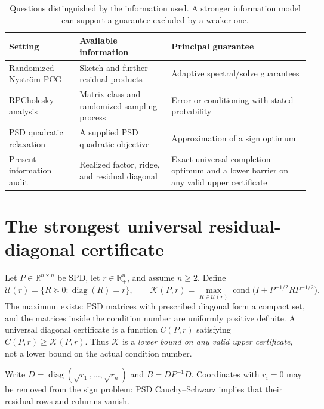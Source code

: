 \documentclass[final,leqno,letterpaper]{etna}
\newcommand{\R}{\mathbb R}
\renewcommand{\diag}{\operatorname{diag}}
\newcommand{\cond}{\operatorname{cond}}
\newcommand{\opt}{\mathcal K}
\begin{document}
\begin{table}[t]
\centering\small
\caption{Questions distinguished by the information used. A stronger information model can support a guarantee excluded by a weaker one.}
\begin{tabular}{>{\raggedright\arraybackslash}p{.27\linewidth}>{\raggedright\arraybackslash}p{.31\linewidth}>{\raggedright\arraybackslash}p{.30\linewidth}}
\toprule
Setting & Available information & Principal guarantee\\\midrule
Randomized Nystr\"om PCG~\cite{ftu} & Sketch and further residual products & Adaptive spectral/solve guarantees\\
RPCholesky analysis~\cite{chen,epperly2026} & Matrix class and randomized sampling process & Error or conditioning with stated probability\\
PSD quadratic relaxation~\cite{nesterov} & A supplied PSD quadratic objective & Approximation of a sign optimum\\
Present information audit & Realized factor, ridge, and residual diagonal & Exact universal-completion optimum and a lower barrier on any valid upper certificate\\\bottomrule
\end{tabular}
\end{table}

\section{The strongest universal residual-diagonal certificate}
Let $P\in\R^{n\times n}$ be SPD, let $r\in\R_+^n$, and assume $n\ge2$. Define
\begin{equation*}
 \mathcal U(r)=\{R\succeq0:\diag(R)=r\},\qquad
 \opt(P,r)=\max_{R\in\mathcal U(r)}
 \cond\bigl(I+P^{-1/2}RP^{-1/2}\bigr).
\end{equation*}
The maximum exists: PSD matrices with prescribed diagonal form a compact set, and the matrices inside the condition number are uniformly positive definite. A universal diagonal certificate is a function $C(P,r)$ satisfying $C(P,r)\ge\opt(P,r)$. Thus $\opt$ is a \emph{lower bound on any valid upper certificate}, not a lower bound on the actual condition number.

Write $D=\diag(\sqrt{r_1},\ldots,\sqrt{r_n})$ and $B=DP^{-1}D$. Coordinates with $r_i=0$ may be removed from the sign problem: PSD Cauchy--Schwarz implies that their residual rows and columns vanish.
\end{document}
